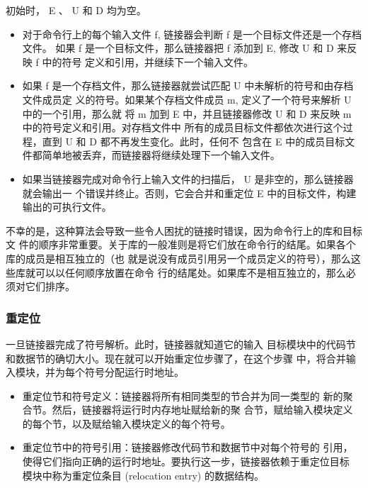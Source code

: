 初始时， E 、 U 和 D 均为空。

\begin{itemize}
    \item 对于命令行上的每个输入文件 f, 链接器会判断 f 是一个目标文件还是一个存档文件。
          如果 f 是一个目标文件，那么链接器把 f 添加到 E, 修改 U 和 D 来反映 f 中的符号
          定义和引用，并继续下一个输入文件。
    \item 如果 f 是一个存档文件，那么链接器就尝试匹配 U 中未解析的符号和由存档文件成员定
          义的符号。如果某个存档文件成员 m, 定义了一个符号来解析 U 中的一个引用，那么就
          将 m 加到 E 中，并且链接器修改 U 和 D 来反映 m 中的符号定义和引用。对存档文件中
          所有的成员目标文件都依次进行这个过程，直到 U 和 D 都不再发生变化。此时，任何不
          包含在 E 中的成员目标文件都简单地被丢弃，而链接器将继续处理下一个输入文件。
    \item 如果当链接器完成对命令行上输入文件的扫描后， U 是非空的，那么链接器就会输出一
          个错误并终止。否则，它会合并和重定位 E 中的目标文件，构建输出的可执行文件。
\end{itemize}

不幸的是，这种算法会导致一些令人困扰的链接时错误，因为命令行上的库和目标文
件的顺序非常重要。关于库的一般准则是将它们放在命令行的结尾。如果各个库的成员是相互独立的（也
就是说没有成员引用另一个成员定义的符号），那么这些库就可以以任何顺序放置在命令
行的结尾处。如果库不是相互独立的，那么必须对它们排序。

\subsubsection{重定位}

一旦链接器完成了符号解析。此时，链接器就知道它的输入
目标模块中的代码节和数据节的确切大小。现在就可以开始重定位步骤了，在这个步骤
中，将合并输入模块，并为每个符号分配运行时地址。

\begin{itemize}
    \item 重定位节和符号定义：链接器将所有相同类型的节合并为同一类型的
          新的聚合节。然后，链接器将运行时内存地址赋给新的聚
          合节，赋给输入模块定义的每个节，以及赋给输入模块定义的每个符号。
    \item 重定位节中的符号引用：链接器修改代码节和数据节中对每个符号的
          引用，使得它们指向正确的运行时地址。要执行这一步，链接器依赖于重定位目标
          模块中称为重定位条目 (relocation entry) 的数据结构。
\end{itemize}

